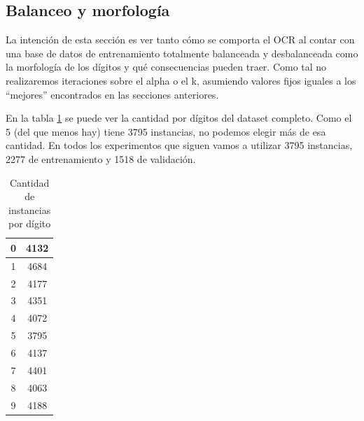 \subsection{Balanceo y morfología}\label{balance}
La intención de esta sección es ver tanto cómo se comporta el OCR al contar con una base de datos de entrenamiento totalmente balanceada y desbalanceada como la morfología de los dígitos y qué consecuencias pueden traer. Como tal no realizaremos iteraciones sobre el alpha o el k, asumiendo valores fijos iguales a los ``mejores'' encontrados en las secciones anteriores.

En la tabla \ref{tab:totalDigitos} se puede ver la cantidad por dígitos del dataset completo. Como el 5 (del que menos hay) tiene 3795 instancias, no podemos elegir más de esa cantidad. En todos los experimentos que siguen vamos a utilizar 3795 instancias, 2277 de entrenamiento y 1518 de validación.

\begin{table}[h]
\centering
\begin{tabular}{|c|c|}
\hline
0 & 4132 \\ \hline
1 & 4684 \\ \hline
2 & 4177 \\ \hline
3 & 4351 \\ \hline
4 & 4072 \\ \hline
5 & 3795 \\ \hline
6 & 4137 \\ \hline
7 & 4401 \\ \hline
8 & 4063 \\ \hline
9 & 4188 \\ \hline
\end{tabular}
\caption{Cantidad de instancias por dígito}
\label{tab:totalDigitos}
\end{table}

